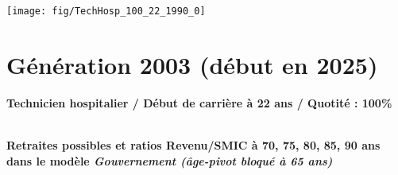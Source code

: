  \vspace{0.1cm} 

 {\hspace{-2.2cm}\texttt{[image: fig/TechHosp\_100\_22\_1990\_0]}} 

\newpage 
 
\section{Génération 2003 (début en 2025)\label{TechHosp_100_22_2003_0}} 
 
{\bf \noindent Technicien hospitalier / Début de carrière à 22 ans / Quotité : 100\%}  ~ 

 ~\\{\bf \noindent Retraites possibles et ratios Revenu/SMIC à 70, 75, 80, 85, 90 ans dans le modèle \emph{Gouvernement (âge-pivot bloqué à 65 ans)}}  
 
